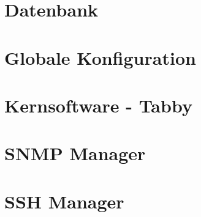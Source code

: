 \documentclass{article}
\begin{document}
	
	\section{Datenbank}
	
	\newpage
	
	\section{Globale Konfiguration}
	
	\newpage
	
	
	
	
	\section{Kernsoftware - Tabby}
	
	\newpage
	
	\section{SNMP Manager}
	
	\newpage
	
	\section{SSH Manager}
	
	\newpage
	
\end{document}
